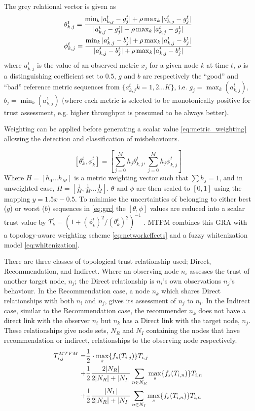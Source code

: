 The grey relational vector is given as
%
\begin{align}
	\label{eq:grc}
	\theta_{k,j}^t = \frac{\min_k|a_{k,j}^t - g_j^t| + \rho \max_k|a_{k,j}^t-g_j^t|}{|a_{k,j}^t-g_j^t| + \rho \max_k|a_{k,j}^t-g_j^t|} \\
	\phi_{k,j}^t = \frac{\min_k|a_{k,j}^t - b_j^t| + \rho \max_k|a_{k,j}^t-b_j^t|}{|a_{k,j}^t-b_j^t| + \rho \max_k|a_{k,j}^t-b_j^t|} \notag 
\end{align}
%
where $a_{k,j}^t$ is the value of an observed metric $x_j$ for a given node $k$ at time $t$, $\rho$ is a distinguishing coefficient set to $0.5$, $g$ and $b$ are respectively the ``good'' and ``bad'' reference metric sequences from $\{a_{k,j}^t k=1,2\dots K\}$, i.e. $g_j=\max_k({a_{k,j}^t})$,  $b_j=\min_k({a_{k,j}^t})$ (where each metric is selected to be monotonically positive for trust assessment, e.g. higher throughput is presumed to be always better). 

Weighting can be applied before generating a scalar value \eqref{eq:metric_weighting} allowing the detection and classification of misbehaviours.

%
\begin{equation}
	\label{eq:metric_weighting}
	[\theta_k^t, \phi_k^t] = \left[\sum_{j=0}^M h_j \theta_{k,j}^t,\sum_{j=0}^M h_j \phi_{k,j}^t \right]
\end{equation}
%
Where $H=[h_0\dots h_M]$ is a metric weighting vector such that $\sum h_j = 1$, and in unweighted case, $H=[\frac{1}{M},\frac{1}{M}\dots\frac{1}{M}]$.
$\theta$ and $\phi$ are then scaled to $[0,1]$ using the mapping $y = 1.5 x - 0.5$.
To minimise the uncertainties of belonging to either best ($g$) or worst ($b$) sequences in \eqref{eq:grc} the $[\theta,\phi]$ values are reduced into a scalar trust value by $T_k^t = ({1+{(\phi_k^t)^2}/{(\theta_k^t)^2}})^{-1}$ \cite{Hong2010}.
MTFM combines this GRA with a topology-aware weighting scheme \eqref{eq:networkeffects} and a fuzzy whitenization model \eqref{eq:whitenization}. 

There are three classes of topological trust relationship used; Direct, Recommendation, and Indirect.
Where an observing node $n_i$ assesses the trust of another target node, $n_j$; the Direct relationship is $n_i$'s own observations $n_j$'s behaviour.
In the Recommendation case, a node $n_k$ which shares Direct relationships with both $n_i$ and $n_j$, gives its assessment of $n_j$ to $n_i$.
In the Indirect case, similar to the Recommendation case, the recommender $n_k$ does not have a direct link with the observer $n_i$ but $n_k$ has a Direct link with the target node, $n_j$.
These relationships give node sets, $N_R$ and $N_I$ containing the nodes that have recommendation or indirect, relationships to the observing node respectively.
%
\begin{align}
	\label{eq:networkeffects}
	T_{i,j}^{MTFM}=&\frac{1}{2} \cdot \max_s\{f_s(T_{i,j})\} T_{i,j}\\ \notag
	+&\frac{1}{2} \frac{2|N_R| }{2|N_R| + |N_I|}\sum_{n \in N_R} \max_s\{f_s(T_{i,n})\} T_{i,n}\\ \notag
	+&\frac{1}{2} \frac{|N_I| }{2|N_R| + |N_I|}\sum_{n \in N_I} \max_s\{f_s(T_{i,n})\} T_{i,n} 
\end{align}

